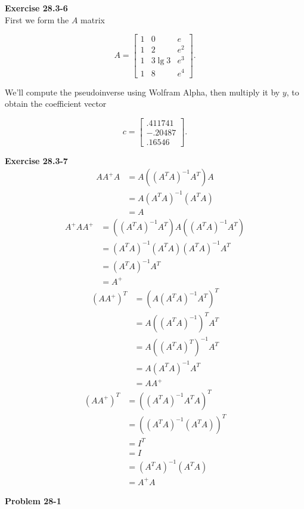 \documentclass{article}
\begin{document}
\noindent\textbf{Exercise 28.3-6}\\

First we form the $A$ matrix 

\[ A = \left[ \begin{array}{ccc} 1 & 0 & e \\ 1 & 2 & e^2 \\ 1 & 3 \lg 3 & e^3 \\ 1 & 8 & e^4 \end{array} \right]. \]

We'll compute the pseudoinverse using Wolfram Alpha, then multiply it by $y$, to obtain the coefficient vector 

\[ c = \left[ \begin{array}{c} .411741 \\ -.20487 \\ .16546 \end{array} \right].\]

\noindent\textbf{Exercise 28.3-7}\\

\begin{align*}
AA^+A &= A ((A^TA)^{-1}A^T)A\\
&= A(A^TA)^{-1}(A^T A)\\
&= A
\end{align*}
\begin{align*}
A^+AA^+ &=  ((A^TA)^{-1}A^T)A((A^TA)^{-1}A^T)\\
 &= (A^TA)^{-1} (A^T A)(A^TA)^{-1} A^T\\ 
 &= (A^TA)^{-1} A^T\\
 &= A^+
\end{align*}
\begin{align*}
(AA^+)^T &= (A (A^TA)^{-1}A^T)^T\\
&= A ((A^T A)^{-1})^T A^T\\
&= A((A^T A)^T)^{-1} A^T\\
&= A(A^T A)^{-1} A^T\\
&= A A^+
\end{align*}
\begin{align*}
(AA^+)^T &= ((A^TA)^{-1}A^T A)^T\\
&= ((A^T A)^{-1}(A^T A))^T \\
&= I^T\\
&= I\\
&= (A^T A)^{-1} (A^TA)\\
&= A^+ A
\end{align*}



\noindent\textbf{Problem 28-1}\\
\end{document}

